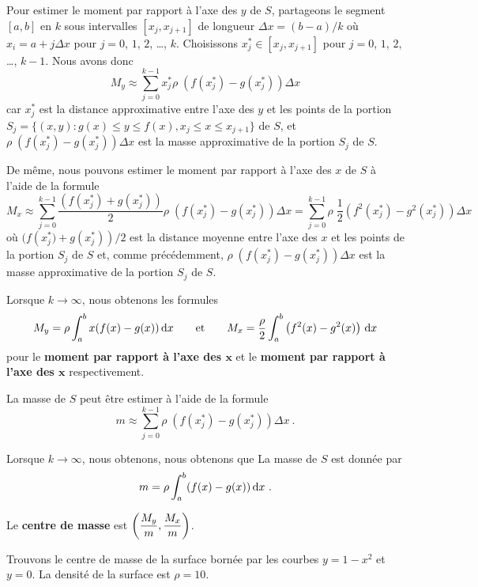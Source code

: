 {

Pour estimer le moment par rapport à l'axe des $y$ de $S$, partageons
le segment $[a,b]$ en $k$ sous intervalles $[x_j,x_{j+1}]$ de longueur
$\Delta x = (b-a)/k$ où $x_i = a + j \Delta x$ pour $j=0$, $1$, $2$,
\ldots , $k$.  Choisissons $x_j^\ast \in [x_j,x_{j+1}]$ pour $j=0$,
$1$, $2$, \ldots , $k-1$.  Nous avons donc
\[
  M_y \approx \sum_{j=0}^{k-1} x_j^\ast \rho\;
  \left( f(x_j^\ast) - g(x_j^\ast)\right) \Delta x
\]
car $x_j^\ast$ est la distance
approximative entre l'axe des $y$ et les points de la portion
$S_j = \{ (x,y) : g(x) \leq y \leq f(x) , x_j \leq x \leq x_{j+1}\}$
de $S$,
et $\rho \;\left(f(x_j^\ast) - g(x_j^\ast)\right) \Delta x$ est la masse
approximative de la portion $S_j$ de $S$.

De même, nous pouvons estimer le moment par rapport à l'axe des $x$ de $S$ à
l'aide de la formule
\[
M_x \approx \sum_{j=0}^{k-1} \frac{(f(x_j^\ast)+g(x_j^\ast))}{2}
\rho\; \left(f(x_j^\ast) - g(x_j^\ast)\right) \Delta x =
\sum_{j=0}^{k-1}\rho\; \frac{1}{2}
\left( f^2(x_j^\ast)-g^2(x_j^\ast)\right) \Delta x
\]
où $(f\left(x_j^\ast)+g(x_j^\ast)\right)/2$ est la distance moyenne
entre l'axe des $x$ et les points de la portion $S_j$ de $S$ et, comme
précédemment, $\rho\; \left(f(x_j^\ast) - g(x_j^\ast)\right) \Delta x$
est la masse approximative de la portion $S_j$ de $S$.

Lorsque $k\to \infty$, nous obtenons les formules
\[
M_y = \rho \int_a^b x(f(x)-g(x)) \,\mathrm{d}x \qquad \text{et} \qquad
M_x = \frac{\rho}{2} \int_a^b \left(f^2(x)-g^2(x) \right) \,\mathrm{d}x
\]
pour le
{\bfseries moment par rapport à l'axe des $\mathbf x$} et le 
{\bfseries moment par rapport à l'axe des $\mathbf x$} respectivement.

La masse de $S$ peut être estimer à l'aide de la formule
\[
  m \approx \sum_{j=0}^{k-1} \rho\;
  \left(f(x_j^\ast) - g(x_j^\ast)\right) \Delta x \ .
\]

Lorsque $k\to \infty$, nous obtenons, nous obtenons que La masse de
$S$ est donnée par
\[
m = \rho \int_a^b (f(x)-g(x)) \,\mathrm{d}x \ .
\]

Le {\bfseries centre de masse} est
$\displaystyle \left( \frac{M_y}{m} , \frac{M_x}{m}\right)$.

\begin{egg}
Trouvons le centre de masse de la surface bornée par les courbes $y=1-x^2$ et
$y=0$.  La densité de la surface est $\rho = 10$.


\end{egg}}
